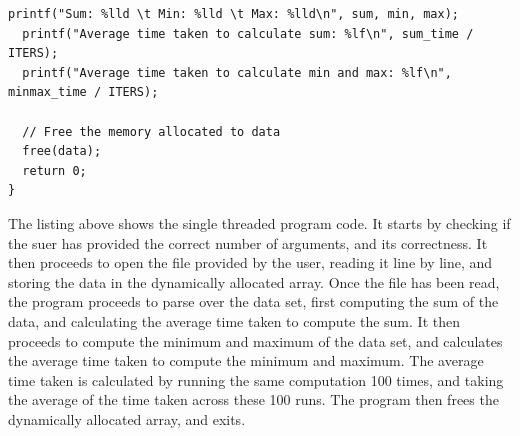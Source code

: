 \documentclass{article}
\theoremstyle{mytheoremstyle}
\theoremstyle{mytheoremstyle}
\theoremstyle{myproblemstyle}
\begin{document}
\begin{lstlisting}[caption={Single Threaded Program} label={lst:single}]
  printf("Sum: %lld \t Min: %lld \t Max: %lld\n", sum, min, max);
  printf("Average time taken to calculate sum: %lf\n", sum_time / ITERS);
  printf("Average time taken to calculate min and max: %lf\n", minmax_time / ITERS);
  
  // Free the memory allocated to data
  free(data); 
  return 0;
}
\end{lstlisting}
The listing above shows the single threaded program code. It starts by checking if the suer has provided the correct number of arguments, and its correctness. It then proceeds to open the file provided by the user, reading it line by line, and storing the data in the dynamically allocated array. Once the file has been read, the program proceeds to parse over the data set, first computing the sum of the data, and calculating the average time taken to compute the sum. It then proceeds to compute the minimum and maximum of the data set, and calculates the average time taken to compute the minimum and maximum. The average time taken is calculated by running the same computation 100 times, and taking the average of the time taken across these 100 runs. The program then frees the dynamically allocated array, and exits.
\pagebreak
\end{document}
